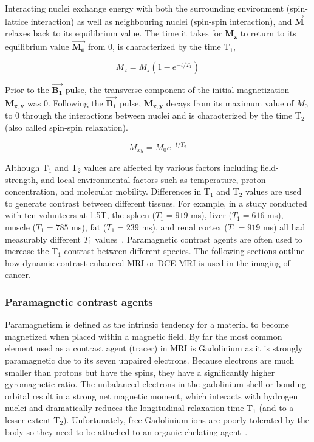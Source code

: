 Interacting nuclei exchange energy with both the surrounding environment (spin-lattice interaction) as well as neighbouring nuclei (spin-spin interaction), and $\vec{\mathbf{M}}$ relaxes back to its equilibrium value. 
The time it takes for $\mathbf{M_z}$ to return to its equilibrium value $\vec{\mathbf{M_0}}$ from 0, is characterized by the time T$_1$,

\begin{equation}
	M_z = M_z(1-e^{-t/T_1})
	\label{T1}
\end{equation}

Prior to the $\vec{\mathbf{B_1}}$ pulse, the transverse component of the initial magnetization $\mathbf{M_{x,y}}$ was 0.
Following the $\vec{\mathbf{B_1}}$ pulse, $\mathbf{M_{x,y}}$ decays from its maximum value of $M_0$ to 0 through the interactions between nuclei and is characterized by the time T$_2$ (also called spin-spin relaxation).
		
\begin{equation}
		M_{xy} = M_0 e^{-t/T_2}
		\label{T2}
\end{equation}

Although T$_1$ and T$_2$ values are affected by various factors including field-strength, and local environmental factors such as temperature, proton concentration, and molecular mobility. 
Differences in T$_1$ and T$_2$ values are used to generate contrast between different tissues. 
For example, in a study conducted with ten volunteers at 1.5T, the spleen ($T_1 = 919$ ms), liver ($T_1 = 616$ ms), muscle ($T_1 = 785$ ms), fat ($T_1 = 239$ ms), and renal cortex ($T_1 = 919$ ms) all had measurably different $T_1$ values~\cite{OConnor:2009ku}.
Paramagnetic contrast agents are often used to increase the T$_1$ contrast between different species. 
The following sections outline how dynamic contrast-enhanced MRI or \acs{DCE-MRI} is used in the imaging of cancer.

\subsubsection{Paramagnetic contrast agents}

Paramagnetism is defined as the intrinsic tendency for a material to become magnetized when placed within a magnetic field.
By far the most common element used as a contrast agent (tracer) in MRI is Gadolinium as it is strongly paramagnetic due to its seven unpaired electrons.
Because electrons are much smaller than protons but have the spins, they have a significantly higher gyromagnetic ratio.
The unbalanced electrons in the gadolinium shell or bonding orbital result in a strong net magnetic moment, which interacts with hydrogen nuclei and dramatically reduces the longitudinal relaxation time T$_1$ (and to a lesser extent T$_2$).
Unfortunately, free Gadolinium ions are poorly tolerated by the body so they need to be attached to an organic chelating agent~\cite{DeLeonRodriguez:2015bl}.

